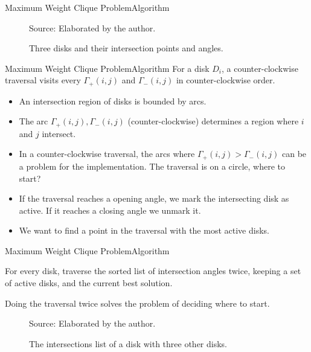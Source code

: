 \documentclass{beamer}
\newcommand{\source}[1]{\caption*{Source: {#1}} }
\begin{document}
\begin{frame}{Maximum Weight Clique Problem}{Algorithm}
	\begin{figure}[H]
		\centering
		
		\caption{Three disks and their intersection points and angles.}
		
		\source{Elaborated by the author.}
		\label{fig:3disks_intersect}
	\end{figure}
\end{frame}


\begin{frame}{Maximum Weight Clique Problem}{Algorithm}
	For a disk $D_i$, a counter-clockwise traversal visits every $\Gamma_+(i,j)$ and $\Gamma_-(i,j)$ in counter-clockwise order.
	
	\begin{itemize}
		\item An intersection region of disks is bounded by arcs.
		
		\item The arc $\Gamma_+(i,j),\Gamma_-(i,j)$ (counter-clockwise) determines a region where $i$ and $j$ intersect.
		
		\item In a counter-clockwise traversal, the arcs where $\Gamma_+(i,j) > \Gamma_-(i,j)$ can be a problem for the implementation. The traversal is on a circle, where to start?
		
		\item If the traversal reaches a opening angle, we mark the intersecting disk as active. If it reaches a closing angle we unmark it.
		
		\item We want to find a point in the traversal with the most active disks.
	\end{itemize}
\end{frame}

\begin{frame}{Maximum Weight Clique Problem}{Algorithm}
	
	For every disk, traverse the sorted list of intersection angles twice, keeping a set of active disks, and the current best solution.
	
	Doing the traversal twice solves the problem of deciding where to start.
	
\begin{figure}[H]
	\centering
	
	\caption{The intersections list of a disk with three other disks.}
	
	\source{Elaborated by the author.}
	\label{fig:array_disks}
\end{figure}
\end{frame}
\end{document}
